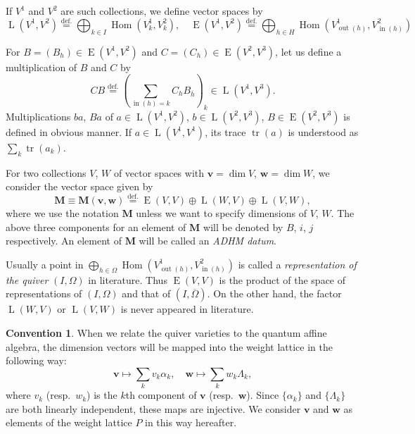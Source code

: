 \documentclass[12pt]{amsart}
\theoremstyle{definition}
\newtheorem{Convention}[equation]{Convention}
\theoremstyle{remark}
\numberwithin{equation}{subsection}
\newcommand{\lsp}[2]{\,{}^{#1}{#2}}
\newcommand{\defeq}{\overset{\operatorname{\scriptstyle def.}}{=}}
\newcommand{\Hom}{\operatorname{Hom}}
\newcommand{\tr}{\operatorname{tr}}
\newcommand{\vin}{\operatorname{in}} %
\newcommand{\vout}{\operatorname{out}} %
\newcommand{\bM}{{\mathbf M}} %
\newcommand{\bv}{{\mathbf v}} %
\newcommand{\bw}{{\mathbf w}} %
\newcommand{\bC}{{\mathbf C}} %
\newcommand{\bI}{{\mathbf I}} %
\newcommand{\HomE}{\operatorname{E}}
\newcommand{\HomL}{\operatorname{L}}
\begin{document}
If $V^1$ and $V^2$ are such collections, we define vector spaces by
\begin{equation}\label{eq:LE}
  \HomL(V^1, V^2) \defeq
  \bigoplus_{k\in I} \Hom(V^1_k, V^2_k), \quad
  \HomE(V^1, V^2) \defeq
  \bigoplus_{h\in H} \Hom(V^1_{\vout(h)}, V^2_{\vin(h)})
\end{equation}

For $B = (B_h) \in \HomE(V^1, V^2)$ and 
$C = (C_h) \in \HomE(V^2, V^3)$, let us define a multiplication of $B$
and $C$ by
\[
  CB \defeq (\sum_{\vin(h) = k} C_h B_{\overline h})_k \in
  \HomL(V^1, V^3).
\]
Multiplications $ba$, $Ba$ of $a\in \HomL(V^1,V^2)$, $b\in\HomL(V^2,
V^3)$, $B\in \HomE(V^2, V^3)$ is defined in obvious manner. If
$a\in\HomL(V^1, V^1)$, its trace $\tr(a)$ is understood as $\sum_k
\tr(a_k)$.

For two collections $V$, $W$ of vector spaces
with $\bv = \dim V$, $\bw = \dim W$, we consider the vector space
given by
\begin{equation}
  \bM \equiv \bM(\bv, \bw) \defeq
  \HomE(V, V) \oplus \HomL(W, V) \oplus \HomL(V, W),
\label{def:bM}\end{equation}
where we use the notation $\bM$ unless we want to specify dimensions
of $V$, $W$.
The above three components for an element of $\bM$ will be denoted by 
$B$, $i$, $j$ respectively.
An element of $\bM$ will be called an {\it ADHM datum\/}.

Usually a point in $\bigoplus_{h\in\Omega} \Hom(V^1_{\vout(h)},
V^2_{\vin(h)})$ is called a {\it representation of the quiver\/}
$(I,\Omega)$ in literature. Thus $\HomE(V,V)$ is the product of the
space of representations of $(I,\Omega)$ and that of
$(I,\overline\Omega)$.
%
On the other hand, the factor $\HomL(W,V)$ or $\HomL(V,W)$ is never
appeared in literature.

\begin{Convention}\label{convention:weight}
When we relate the quiver varieties to the quantum affine algebra,
the dimension vectors will be mapped into the weight lattice in the 
following way:
\begin{equation*}
    \bv \mapsto \sum_k v_k \alpha_k, \quad
    \bw \mapsto \sum_k w_k \Lambda_k,
\end{equation*}
where $v_k$ (resp.\ $w_k$) is the $k$th component of $\bv$ (resp.\ 
$\bw$). Since $\{ \alpha_k \}$ and $\{ \Lambda_k \}$ are both
linearly independent, these maps are injective. We consider $\bv$ and
$\bw$ as elements of the weight lattice $P$ in this way hereafter.
\end{Convention}
\end{document}

